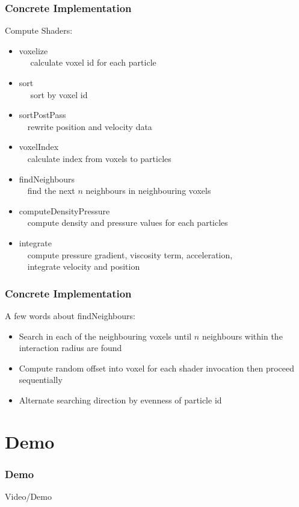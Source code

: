 \documentclass{beamer}
\begin{document}
\begin{frame}
    \frametitle{Concrete Implementation}
    Compute Shaders:
    \begin{itemize}
        \item voxelize\\ $\quad$ calculate voxel id for each particle
        \item <2->sort\\ $\quad$ sort by voxel id
        \item <3->sortPostPass\\$\quad$rewrite position and velocity data
        \item <4->voxelIndex\\$\quad$calculate index from voxels to particles
        \item <5->findNeighbours\\$\quad$find the next $n$ neighbours in neighbouring voxels
        \item <6->computeDensityPressure\\$\quad$compute density and pressure values for each particles
        \item <7->integrate\\$\quad$compute pressure gradient, viscosity term, acceleration,\\$\quad$integrate velocity and position
    \end{itemize}
\end{frame}
\begin{frame}
    \frametitle{Concrete Implementation}
    A few words about findNeighbours:
    \begin{itemize}
        \item Search in each of the neighbouring voxels until $n$ neighbours within the interaction radius are found
        \item Compute random offset into voxel for each shader invocation then proceed sequentially
        \item Alternate searching direction by evenness of particle id
    \end{itemize}
\end{frame}

\section{Demo}
\begin{frame}
    \frametitle{Demo}
    \begin{center}
        Video/Demo
    \end{center}
\end{frame}
    
\end{document}
